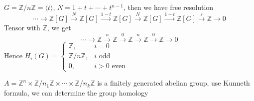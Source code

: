 \documentclass[../main.tex]{subfiles}
\begin{document}
\begin{example}
$G=\mathbb Z/n\mathbb Z=\langle t\rangle$, $N=1+t+\cdots+t^{n-1}$, then we have free resolution
\[\cdots\to\mathbb Z[G]\xrightarrow{N}\mathbb Z[G]\xrightarrow{1-t}\mathbb Z[G]\xrightarrow{N}\mathbb Z[G]\xrightarrow{1-t}\mathbb Z[G]\xrightarrow{\varepsilon}\mathbb Z\to0\]
Tensor with $\mathbb Z$, we get
\[\cdots\to\mathbb Z\xrightarrow{n}\mathbb Z\xrightarrow{0}\mathbb Z\xrightarrow{n}\mathbb Z\xrightarrow{0}\mathbb Z\to0\]
Hence $H_i(G)=\begin{cases}
\mathbb Z, &i=0 \\
\mathbb Z/n\mathbb Z, &i\text{ odd} \\
0, &i>0\text{ even}
\end{cases}$
\end{example}

\begin{corollary}
$A=\mathbb Z^n\times\mathbb Z/n_1\mathbb Z\times\cdots\times\mathbb Z/n_k\mathbb Z$ is a finitely generated abelian group, use Kunneth formula, we can determine the group homology
\end{corollary}
\end{document}
